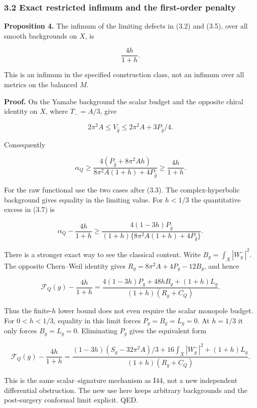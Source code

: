 \documentclass[
  11pt,
]{article}
\begin{document}
\hypertarget{exact-restricted-infimum-and-the-first-order-penalty}{%
\subsubsection{3.2 Exact restricted infimum and the first-order
penalty}\label{exact-restricted-infimum-and-the-first-order-penalty}}

\textbf{Proposition 4.} The infimum of the limiting defects in (3.2) and
(3.5), over all smooth backgrounds on \(X\), is

\[
 \boxed{\frac{4h}{1+h}.} \tag{3.6}
\]

This is an infimum in the specified construction class, not an infimum
over all metrics on the balanced \(M\).

\textbf{Proof.} On the Yamabe background the scalar budget and the
opposite chiral identity on \(X\), where \(T_-=A/3\), give

\[
 2\pi^2A\le V_{\widehat g}\le2\pi^2A+3P_{\widehat g}/4.
\]

Consequently

\[
 \alpha_Q\ge
 \frac{4(P_{\widehat g}+8\pi^2Ah)}
      {8\pi^2A(1+h)+4P_{\widehat g}}
 \ge\frac{4h}{1+h}. \tag{3.7}
\]

For the raw functional use the two cases after (3.3). The
complex-hyperbolic background gives equality in the limiting value. For
\(h<1/3\) the quantitative excess in (3.7) is

\[
 \alpha_Q-\frac{4h}{1+h}\ge
 \frac{4(1-3h)P_{\widehat g}}
 {(1+h)\{8\pi^2A(1+h)+4P_{\widehat g}\}}. \tag{3.8}
\]

There is a stronger exact way to see the classical content. Write
\(B_g=\int_X|W_g^-|^2\). The opposite Chern--Weil identity gives
\(R_g=8\pi^2A+4P_g-12B_g\), and hence

\[
 \boxed{\mathcal F_Q(g)-\frac{4h}{1+h}
 =\frac{4(1-3h)P_g+48hB_g+(1+h)L_g}
       {(1+h)(R_g+C_Q)}.} \tag{3.9a}
\]

Thus the finite-\(h\) lower bound does not even require the scalar
monopole budget. For \(0<h<1/3\), equality in this limit forces
\(P_g=B_g=L_g=0\). At \(h=1/3\) it only forces \(B_g=L_g=0\).
Eliminating \(P_g\) gives the equivalent form

\[
 \mathcal F_Q(g)-\frac{4h}{1+h}
 =\frac{(1-3h)(S_g-32\pi^2A)/3+16\int_X|W_g^-|^2+(1+h)L_g}
       {(1+h)(R_g+C_Q)}. \tag{3.9b}
\]

This is the same scalar--signature mechanism as I44, not a new
independent differential obstruction. The new use here keeps arbitrary
backgrounds and the post-surgery conformal limit explicit. QED.
\end{document}
